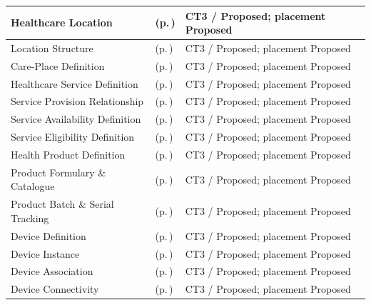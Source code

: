 \begin{longtable}{|>{\raggedright\arraybackslash}p{0.37\TableWidth}|>{\raggedright\arraybackslash}p{0.4\TableWidth}|>{\raggedright\arraybackslash}p{0.23\TableWidth}|}
Healthcare Location & \nameref{cap:bec-healthcare-location} (p.\,\pageref{cap:bec-healthcare-location}) & CT3 / Proposed; placement Proposed\\\hline
Location Structure & \nameref{cap:bec-healthcare-location} (p.\,\pageref{cap:bec-healthcare-location}) & CT3 / Proposed; placement Proposed\\\hline
Care-Place Definition & \nameref{cap:bec-care-place-definition} (p.\,\pageref{cap:bec-care-place-definition}) & CT3 / Proposed; placement Proposed\\\hline
Healthcare Service Definition & \nameref{cap:bec-healthcare-service-definition} (p.\,\pageref{cap:bec-healthcare-service-definition}) & CT3 / Proposed; placement Proposed\\\hline
Service Provision Relationship & \nameref{cap:bec-healthcare-service-definition} (p.\,\pageref{cap:bec-healthcare-service-definition}) & CT3 / Proposed; placement Proposed\\\hline
Service Availability Definition & \nameref{cap:bec-healthcare-service-definition} (p.\,\pageref{cap:bec-healthcare-service-definition}) & CT3 / Proposed; placement Proposed\\\hline
Service Eligibility Definition & \nameref{cap:bec-healthcare-service-definition} (p.\,\pageref{cap:bec-healthcare-service-definition}) & CT3 / Proposed; placement Proposed\\\hline
Health Product Definition & \nameref{cap:bec-health-product-definition} (p.\,\pageref{cap:bec-health-product-definition}) & CT3 / Proposed; placement Proposed\\\hline
Product Formulary \& Catalogue & \nameref{cap:bec-product-formulary-catalogue} (p.\,\pageref{cap:bec-product-formulary-catalogue}) & CT3 / Proposed; placement Proposed\\\hline
Product Batch \& Serial Tracking & \nameref{cap:bec-product-batch-serial-tracking} (p.\,\pageref{cap:bec-product-batch-serial-tracking}) & CT3 / Proposed; placement Proposed\\\hline
Device Definition & \nameref{cap:bec-device-definition} (p.\,\pageref{cap:bec-device-definition}) & CT3 / Proposed; placement Proposed\\\hline
Device Instance & \nameref{cap:bec-device-definition} (p.\,\pageref{cap:bec-device-definition}) & CT3 / Proposed; placement Proposed\\\hline
Device Association & \nameref{cap:bec-reviewed-device-utilisation-administration} (p.\,\pageref{cap:bec-reviewed-device-utilisation-administration}) & CT3 / Proposed; placement Proposed\\\hline
Device Connectivity & \nameref{cap:bec-reviewed-device-oa-m-metadata-management} (p.\,\pageref{cap:bec-reviewed-device-oa-m-metadata-management}) & CT3 / Proposed; placement Proposed\\\hline
\end{longtable}\endgroup
